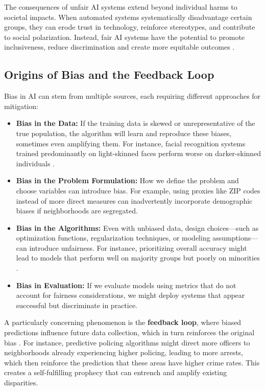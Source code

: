 \documentclass[12pt,a4paper,openright,twoside]{book}
\begin{document}
The consequences of unfair AI systems extend beyond individual harms to societal impacts. When automated systems systematically disadvantage certain groups, they can erode trust in technology, reinforce stereotypes, and contribute to social polarization. Instead, fair AI systems have the potential to promote inclusiveness, reduce discrimination and create more equitable outcomes \cite{Ferrara2023}.

\subsection{Origins of Bias and the Feedback Loop}
Bias in AI can stem from multiple sources, each requiring different approaches for mitigation:

\begin{itemize}
    \item \textbf{Bias in the Data:} If the training data is skewed or unrepresentative of the true population, the algorithm will learn and reproduce these biases, sometimes even amplifying them. For instance, facial recognition systems trained predominantly on light-skinned faces perform worse on darker-skinned individuals \cite{buolamwini2018gender}.
    
    \item \textbf{Bias in the Problem Formulation:} How we define the problem and choose variables can introduce bias. For example, using proxies like ZIP codes instead of more direct measures can inadvertently incorporate demographic biases if neighborhoods are segregated.
    
    \item \textbf{Bias in the Algorithms:} Even with unbiased data, design choices—such as optimization functions, regularization techniques, or modeling assumptions—can introduce unfairness. For instance, prioritizing overall accuracy might lead to models that perform well on majority groups but poorly on minorities \cite{10749873}.
    
    \item \textbf{Bias in Evaluation:} If we evaluate models using metrics that do not account for fairness considerations, we might deploy systems that appear successful but discriminate in practice.
    
\end{itemize}

A particularly concerning phenomenon is the \textbf{feedback loop}, where biased predictions influence future data collection, which in turn reinforces the original bias \cite{ensign2018runaway}. For instance, predictive policing algorithms might direct more officers to neighborhoods already experiencing higher policing, leading to more arrests, which then reinforce the prediction that these areas have higher crime rates. This creates a self-fulfilling prophecy that can entrench and amplify existing disparities.
\end{document}
